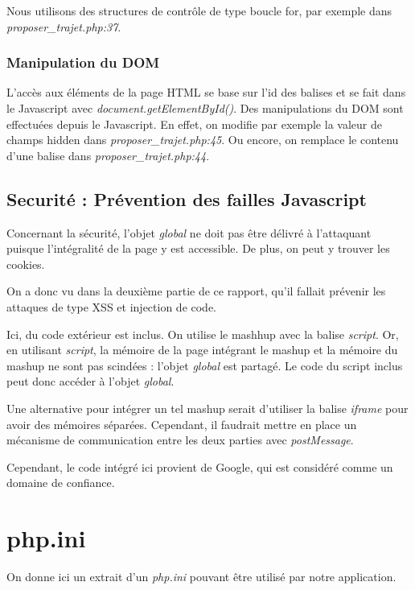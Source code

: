 \documentclass[a4paper]{article}
\begin{document}
Nous utilisons des structures de contrôle de type boucle for, par exemple
dans \textit{proposer\_trajet.php:37}.

\subsubsection{Manipulation du DOM}

L'accès aux éléments de la page HTML se base sur l'id des balises et se fait dans le Javascript
avec \textit{document.getElementById()}.
Des manipulations du DOM sont effectuées depuis le Javascript.
En effet, on modifie par exemple la valeur de champs hidden dans \textit{proposer\_trajet.php:45}.
Ou encore, on remplace le contenu d'une balise dans \textit{proposer\_trajet.php:44}.

\subsection{Securité : Prévention des failles Javascript}

Concernant la sécurité, l'objet \textit{global} ne doit pas être délivré
à l'attaquant puisque l'intégralité de la page y est accessible. De plus,
on peut y trouver les cookies. 

On a donc vu dans la deuxième partie de ce rapport, qu'il fallait prévenir
les attaques de type XSS et injection de code.

Ici, du code extérieur est inclus. On utilise le mashhup avec la balise \textit{script}.
Or, en utilisant \textit{script}, la mémoire de la page intégrant le mashup et la mémoire du mashup 
ne sont pas scindées : l'objet \textit{global} est partagé. Le code du script inclus peut donc accéder
à l'objet \textit{global}.

Une alternative pour intégrer un tel mashup serait d'utiliser la balise \textit{iframe} pour avoir
des mémoires séparées. Cependant, il faudrait mettre en place un mécanisme de communication entre les deux
parties avec \textit{postMessage}.

Cependant, le code intégré ici provient de Google, qui est considéré comme un domaine de confiance.

\newpage
\appendix
\section{php.ini}
On donne ici un extrait d'un \textit{php.ini} pouvant être
utilisé par notre application.
\end{document}
